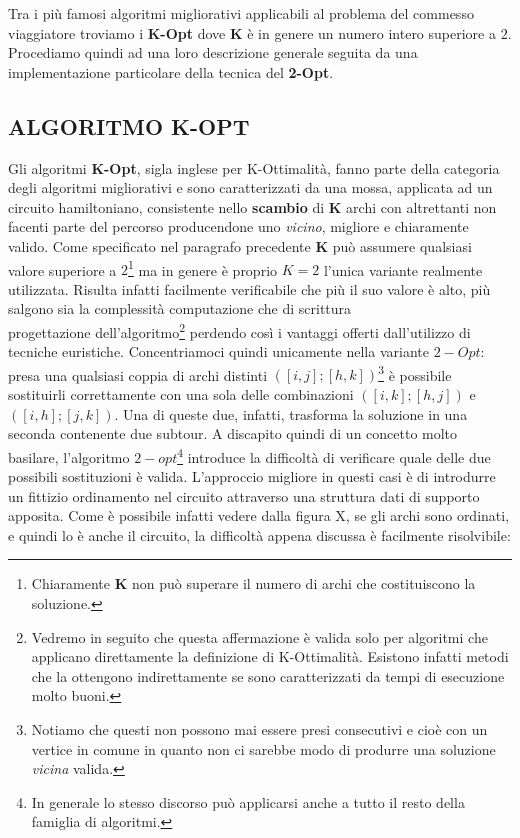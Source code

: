\documentclass[11pt]{article}
\begin{document}
Tra i più famosi algoritmi migliorativi applicabili al problema del commesso viaggiatore troviamo i \textbf{K-Opt} dove \textbf{K} è in genere un numero intero superiore a $2$. Procediamo quindi ad una loro descrizione generale seguita da una implementazione particolare della tecnica del \textbf{2-Opt}.

\subsection*{ALGORITMO K-OPT}
\label{sec:KOptS}

Gli algoritmi \textbf{K-Opt}, sigla inglese per K-Ottimalità, fanno parte della categoria degli algoritmi migliorativi e sono caratterizzati da una mossa, applicata ad un circuito hamiltoniano, consistente nello \textbf{scambio} di \textbf{K} archi con altrettanti non facenti parte del percorso producendone uno \textit{vicino}, migliore e chiaramente valido.
Come specificato nel paragrafo precedente \textbf{K} può assumere qualsiasi valore superiore a $2$\footnote{Chiaramente \textbf{K} non può superare il numero di archi che costituiscono la soluzione.} ma in genere è proprio $K = 2$ l'unica variante realmente utilizzata. Risulta infatti facilmente verificabile che più il suo valore è alto, più salgono sia la complessità computazione che di scrittura\\progettazione dell'algoritmo\footnote{Vedremo in seguito che questa affermazione è valida solo per algoritmi che applicano direttamente la definizione di K-Ottimalità. Esistono infatti metodi che la ottengono indirettamente se sono caratterizzati da tempi di esecuzione molto buoni.} perdendo così i vantaggi offerti dall'utilizzo di tecniche euristiche.
Concentriamoci quindi unicamente nella variante $2-Opt$: presa una qualsiasi coppia di archi distinti $([i,j];[h,k])$\footnote{Notiamo che questi non possono mai essere presi consecutivi e cioè con un vertice in comune in quanto non ci sarebbe modo di produrre una soluzione \textit{vicina} valida.} è possibile sostituirli correttamente con una sola delle combinazioni $([i,k];[h,j])$ e $([i,h];[j,k])$. Una di queste due, infatti, trasforma la soluzione in una seconda contenente due subtour.
A discapito quindi di un concetto molto basilare, l'algoritmo $2-opt$\footnote{In generale lo stesso discorso può applicarsi anche a tutto il resto della famiglia di algoritmi.} introduce la difficoltà di verificare quale delle due possibili sostituzioni è valida. L'approccio migliore in questi casi è di introdurre un fittizio ordinamento nel circuito attraverso una struttura dati di supporto apposita. Come è possibile infatti vedere dalla figura X, se gli archi sono ordinati, e quindi lo è anche il circuito, la difficoltà appena discussa è facilmente risolvibile: 
\end{document}
